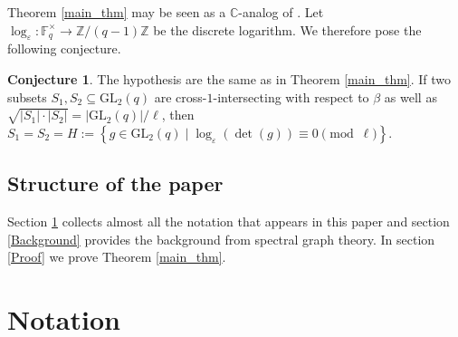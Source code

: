 \documentclass[12pt, reqno]{amsart}
\theoremstyle{definition}
\newtheorem{conjecture}[theorem]{Conjecture}
\theoremstyle{remark}
\numberwithin{equation}{section}
\newcommand{\BC}{\mathbb{C}}
\newcommand{\BF}{\mathbb{F}}
\newcommand{\BZ}{\mathbb{Z}}
\newcommand{\cb}[1]{\left\{#1\right\}}
\newcommand{\abs}[1]{\left|#1\right|}
\newcommand{\GL}{\mathrm{GL}}
\begin{document}
Theorem \ref{main_thm} may be seen as a $\BC$-analog of \cite[Theorem 1.2]{MR4521814}. Let $\log_\varepsilon: \BF_q^\times \rightarrow \BZ/(q - 1)\BZ$ be the discrete logarithm. We therefore pose the following conjecture.

\begin{conjecture}
	
	The hypothesis are the same as in Theorem \ref{main_thm}. If two subsets $S_1, S_2 \subseteq \GL_2(q)$ are cross-$1$-intersecting with respect to $\beta$ as well as $\sqrt{\abs{S_1}\cdot\abs{S_2}} = \abs{\GL_2(q)}/\ell$, then $S_1 = S_2 = H:= \cb{g \in \GL_2(q) \;|\;  \log_\varepsilon(\det(g)) \equiv 0 \pmod{\ell}}$.		
	
\end{conjecture}

\subsection{Structure of the paper}

Section \ref{Notation} collects almost all the notation that appears in this paper and section \ref{Background} provides the background from spectral graph theory. In section \ref{Proof} we prove Theorem \ref{main_thm}.

\newpage
\section{Notation}\label{Notation}
\end{document}
